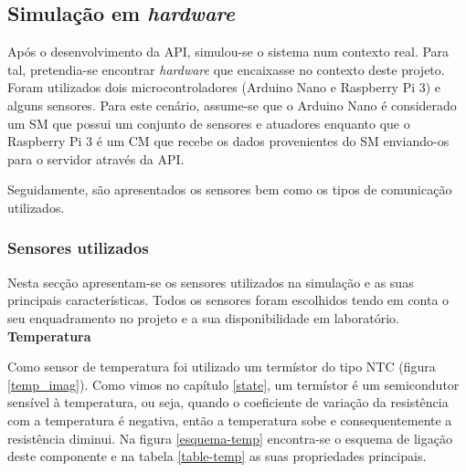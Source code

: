 \newpage
\subsection{Simulação em \textit{hardware}}
\label{arq-hardw}


Após o desenvolvimento da \ac{API}, simulou-se o sistema num contexto real. Para tal, pretendia-se encontrar \textit{hardware} que encaixasse no contexto deste projeto. Foram utilizados dois microcontroladores (Arduino Nano e Raspberry Pi 3) e alguns sensores. Para este cenário, assume-se que o Arduino Nano é considerado um \acl{SM} que possui um conjunto de sensores e atuadores enquanto que o Raspberry Pi 3 é um \acl{CM} que recebe os dados provenientes do \acl{SM} enviando-os para o servidor através da API.  

Seguidamente, são apresentados os sensores bem como os tipos de comunicação utilizados. 
 

\subsubsection{Sensores utilizados}

Nesta secção apresentam-se os sensores utilizados na simulação e as suas principais características. Todos os sensores foram escolhidos tendo em conta o seu enquadramento no projeto e a sua disponibilidade em laboratório. \\


\textbf{Temperatura}


Como sensor de temperatura foi utilizado um termístor do tipo \ac{NTC} (figura \ref{temp_imag}). Como vimos no capítulo \ref{state}, um termístor é um semicondutor sensível à temperatura, ou seja, quando o coeficiente de variação da resistência com a temperatura é negativa, então a temperatura sobe e consequentemente a resistência diminui. Na figura \ref{esquema-temp} encontra-se o esquema de ligação deste componente e na tabela \ref{table-temp} as suas propriedades principais\cite{temp-dta}. 

